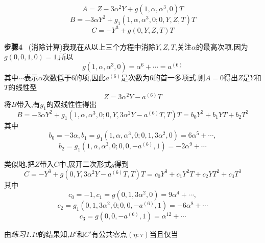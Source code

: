 \documentclass[UTF8]{book}
\begin{document}
	\begin{equation*}
	A=Z-3\alpha^{2}Y+g(1,\alpha,\alpha^{3},0)T
	\end{equation*}
	\begin{equation*}
	B=-3\alpha Y^{2}+g_{1}(1,\alpha,\alpha^{3},0;0,Y,Z,T)T
	\end{equation*}
	\begin{equation*}
	C=-Y^{3}+g(0,Y,Z,T)T
	\end{equation*}
	
	\textbf{步骤4} \ (消除计算)我现在从以上三个方程中消除$ Y,Z,T $,关注$\alpha$的最高次项.因为$ g(0,0,1,0)=1 $,所以
	\begin{equation*}
	g(1,\alpha,\alpha^{3},0)=\alpha^{6}+\cdots =a^{(6)}
	\end{equation*}
	其中$\cdots$表示$\alpha$次数低于6的项,因此$a^{(6)}$是次数为6的首一多项式.则$ A=0 $得出$ Z $是$ Y $和$ T $的线性型
	\begin{equation*}
	Z=3\alpha^{2}Y-a^{(6)}T
	\end{equation*}
	将$ B $带入,有$g_{1}$的双线性性得出
	\begin{equation*}
	B=-3\alpha Y^{2}+g_{1}(1,\alpha,\alpha^{3},0;0,Y,3\alpha^{2}Y-a^{(6)}T,T)T=b_{0}Y^{2}+b_{1}YT+b_{2}T^{2}
	\end{equation*}
	其中
	\begin{equation*}
	b_{0}=-3\alpha, b_{1}=g_{1}(1,\alpha,\alpha^{3},0;0,1,3\alpha^{2},0)=6\alpha^{5}+\cdots,
	\end{equation*}
	\begin{equation*}
	b_{2}=g_{1}(1,\alpha,\alpha^{3},0;0,0,-a^{(6)},1)=-2\alpha^{9}+\cdots
	\end{equation*}
	
	类似地,把$ Z $带入$ C $中,展开二次形式$ g $得到
	\begin{equation*}
	C=-Y^{3}+g(0,Y,3\alpha^{2}Y-a^{(6)}T,T)T=c_{0}Y^{3}+c_{1}Y^{2}T+c_{2}YT^{2}+c_{3}T^{3}
	\end{equation*}
	其中
	\begin{equation*}
	c_{0}=-1, c_{1}=g(0,1,3\alpha^{2},0)=9\alpha^{4}+\cdots,
	\end{equation*}
	\begin{equation*}
	c_{2}=g_{1}(0,1,3\alpha^{2},0;0,0,-a^{(6)},1)=-6\alpha^{8}+\cdots
	\end{equation*}
	\begin{equation*}
	c_{3}=g(0,0,-a^{(6)},1)=\alpha^{12}+\cdots
	\end{equation*}
	
	由\textit{练习1.10}的结果知,$B{'}$和$C{'}$有公共零点$(\eta:\tau)$当且仅当
	
\end{document}

